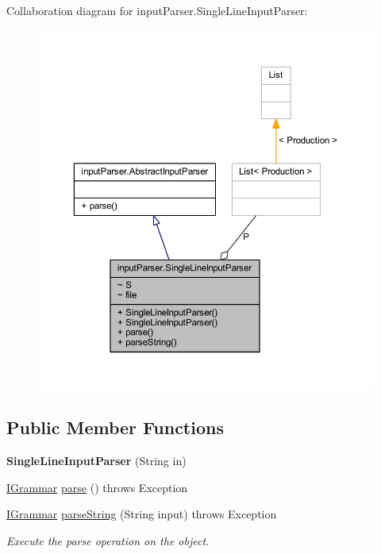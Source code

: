 Collaboration diagram for input\-Parser.\-Single\-Line\-Input\-Parser\-:\nopagebreak
\begin{figure}[H]
\begin{center}
\leavevmode
\includegraphics[width=350pt]{classinput_parser_1_1_single_line_input_parser__coll__graph}
\end{center}
\end{figure}
\subsection*{Public Member Functions}
\begin{DoxyCompactItemize}
\item 
\hypertarget{classinput_parser_1_1_single_line_input_parser_a3efb0396347ec7ed7376dbd37eb4d28c}{{\bfseries Single\-Line\-Input\-Parser} (String in)}\label{classinput_parser_1_1_single_line_input_parser_a3efb0396347ec7ed7376dbd37eb4d28c}

\item 
\hyperlink{interfacecontext_free_1_1grammar_1_1_i_grammar}{I\-Grammar} \hyperlink{classinput_parser_1_1_single_line_input_parser_ad822676b0d3182a591e2004c3bcc79d5}{parse} ()  throws Exception 
\item 
\hyperlink{interfacecontext_free_1_1grammar_1_1_i_grammar}{I\-Grammar} \hyperlink{classinput_parser_1_1_single_line_input_parser_a90641140f8686fc97fd40b72beccf0a3}{parse\-String} (String input)  throws Exception 
\begin{DoxyCompactList}\small\item\em Execute the parse operation on the object. \end{DoxyCompactList}\end{DoxyCompactItemize}
